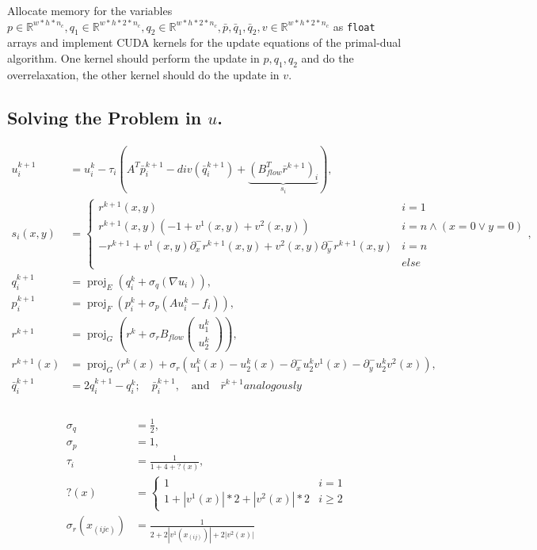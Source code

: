 \documentclass[A4,12pt]{article}
\DeclareMathOperator*{\proj}{proj}
\newcommand{\R}{\mathbb{R}}
\begin{document}
Allocate memory for the variables $p \in \R^{w*h*n_c},q_1 \in \R^{w*h*2*n_c},q_2 \in \R^{w*h*2*n_c},\bar p, \bar q_1, \bar q_2, v \in \R^{w*h*2*n_c}$ as {\tt float} arrays and implement CUDA kernels for the update equations of the primal-dual algorithm. One kernel should perform the update in $p, q_1, q_2$ and do the overrelaxation, the other kernel should do the update in $v$. 

\subsection{Solving the Problem in $u$.}
\begin{equation}
\begin{aligned}
u_i^{k+1}&=u_i^k-\tau_i(A^T\bar p_i^{k+1}-div(\bar q_i^{k+1})+\underbrace{(B_{flow}^T\bar r^{k+1})_i}_{s_i}) , \\
s_i(x,y)&=\begin{cases}r^{k+1}(x,y) & i=1 \\
r^{k+1}(x,y)(-1+v^1(x,y)+v^2(x,y)) & i = n \wedge (x=0\vee y=0) \\
-r^{k+1}+v^1(x,y)\partial^-_xr^{k+1}(x,y)+v^2(x,y)\partial^-_yr^{k+1}(x,y) & i=n \\
& else\end{cases}, \\
q_i^{k+1}&=\proj_E(q_i^k + \sigma_q (\nabla u_i)), \\
p_i^{k+1}&=\proj_F(p_i^k + \sigma_p (Au_i^k - f_i)), \\
r^{k+1}&=\proj_G(r^{k} + \sigma_r B_{flow}\begin{pmatrix}u_1^k \\ u_2^k\end{pmatrix}), \\
r^{k+1}(x)&=\proj_G(r^{k}(x) + \sigma_r(u_1^k(x)-u_2^k(x)-\partial^-_xu_2^kv^1(x)-\partial^-_yu_2^kv^2(x)), \\
\bar q_i^{k+1}&=2q_i^{k+1}-q_i^k; \quad \bar p_i^{k+1},\quad \textrm{and} \quad \bar r^{k+1} analogously \\
\end{aligned}
\end{equation}
\\
\begin{equation}
\begin{aligned}
\sigma_q &= \frac{1}{2}, \\
\sigma_p &= 1, \\
\tau_i&=\frac{1}{1+4+?(x)}, \\
?(x)&=\begin{cases} 1 & i=1 \\ 1+|v^1(x)|*2+|v^2(x)|*2 & i \geq 2 \end{cases} \\
\sigma_r (x_{(ijc)}) &= \frac{1}{2+2|v^1(x_{(ij)})|+2|v^2(x)|} \\
\end{aligned}
\end{equation}
\end{document}
